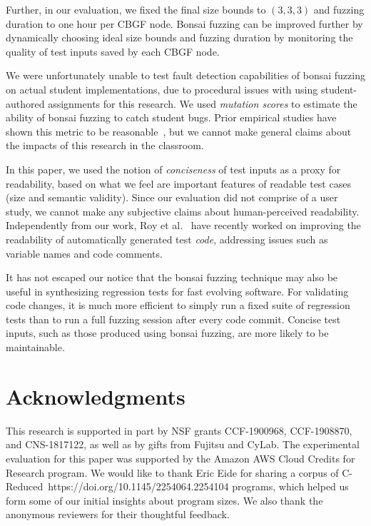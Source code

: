 \documentclass[conference]{IEEEtran}
\newcommand{\tech}{bonsai fuzzing} \newcommand{\Tech}{Bonsai fuzzing} \newcommand{\TECH}{Bonsai Fuzzing}
\begin{document}
Further, in our evaluation, we fixed the final size bounds to $(3,3,3)$ and fuzzing duration to one hour per CBGF node. \Tech{} can be improved further by dynamically choosing ideal size bounds and fuzzing duration by monitoring the quality of test inputs saved by each CBGF node.

We were unfortunately unable to test fault detection capabilities of \tech{} on actual student implementations, due to procedural issues with using student-authored assignments for this research. We used \emph{mutation scores} to estimate the ability of \tech{} to catch student bugs. Prior empirical studies have shown this metric to be reasonable~\cite{Just14}, but we cannot make general claims about the impacts of this research in the classroom.

In this paper, we used the notion of \emph{conciseness} of test inputs as a proxy for {readability}, based on what we feel are important features of readable test cases (size and semantic validity). Since our evaluation did not comprise of a user study, we cannot make any subjective claims about human-perceived readability. 
Independently from our work, Roy et al.~\cite{Roy20} have recently worked on improving the readability of automatically generated test \emph{code}, addressing issues such as variable names and code comments.

It has not escaped our notice that the \tech{} technique may also be useful in synthesizing regression tests for fast evolving software. For validating code changes, it is much more efficient to simply run a fixed suite of regression tests than to run a full fuzzing session after every code commit. Concise test inputs, such as those produced using \tech{}, are more likely to be maintainable.



\section*{Acknowledgments}

This research is supported in part by NSF grants CCF-1900968, CCF-1908870, and CNS-1817122, as well as by gifts from Fujitsu and CyLab. The experimental evaluation for this paper was supported by the Amazon AWS Cloud Credits for Research program. We would like to thank Eric Eide for sharing a corpus of C-Reduced~https://doi.org/10.1145/2254064.2254104 programs, which helped us form some of our initial insights about program sizes. We also thank the anonymous reviewers for their thoughtful feedback.  



 









\balance
\end{document}
